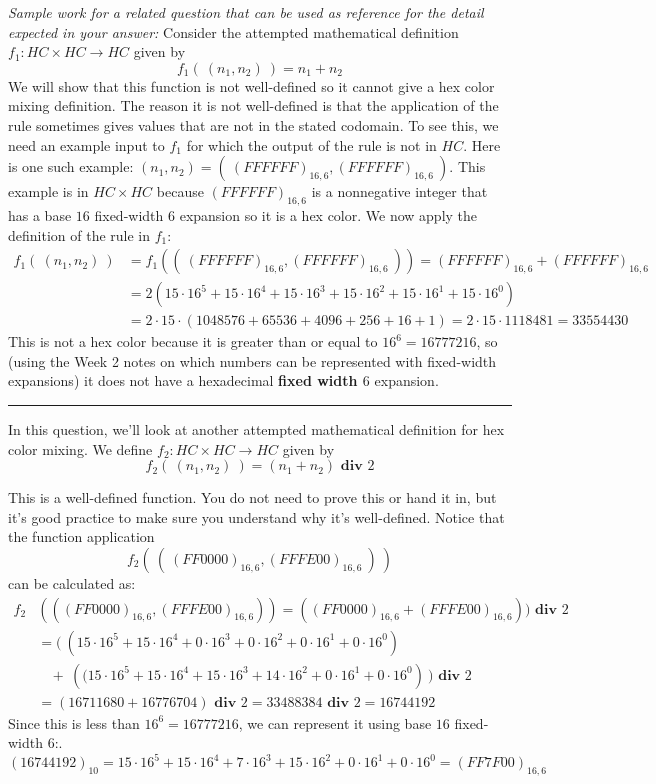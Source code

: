 \documentclass[12pt, oneside]{article}
\begin{document}
\begin{enumerate}[labelindent=0pt, leftmargin=0pt]
\begin{enumerate}
{\it Sample work for a related question that can be used as reference for the detail expected 
in your answer:} Consider the attempted mathematical definition  $f_1: HC\times HC \to HC$ given by
\[
f_1 (~(n_1, n_2) ~) = n_1 + n_2
\]
We will show that this function is not well-defined so it cannot give a hex color mixing definition. 
The reason it is not well-defined
is that the application of the rule sometimes gives values that are not in the stated codomain. 
To see this, we need an example input to $f_1$ for which the output of the rule is not in $HC$.
Here is one such example: $(n_1, n_2) = (~(FFFFFF)_{16,6}, (FFFFFF)_{16,6}~)$. 
This example is in $HC \times HC$
because $(FFFFFF)_{16,6}$ is a nonnegative integer that has a base $16$ fixed-width $6$ expansion 
so it is a hex color.
We now apply the definition of the rule in $f_1$:
\begin{align*}
f_1 (~(n_1, n_2) ~) &=  f_1 ( (~(FFFFFF)_{16,6}, (FFFFFF)_{16,6}~) ) = (FFFFFF)_{16,6} + (FFFFFF)_{16,6} \\
&= 2 \left( 15\cdot 16^5 + 15\cdot 16^4 + 15 \cdot 16^3 + 15 \cdot 16^2 + 15 \cdot 16^1 + 15 \cdot 16^0 \right) \\
&= 2 \cdot 15 \cdot (1048576 + 65536 + 4096 + 256 + 16 + 1) = 2 \cdot 15 \cdot 1118481 = 33554430
\end{align*}
This is not a hex color because it is greater than or equal to $16^6 = 16777216$, 
so (using the Week 2 notes on which numbers can be represented
with fixed-width expansions) it does not have a hexadecimal {\bf fixed width $6$} expansion.

\rule{0.5\textwidth}{.4pt}

In this question, we'll look at another attempted mathematical definition for hex color mixing. 
We define $f_2: HC\times HC \to HC$ given by
\[
f_2 (~(n_1, n_2) ~) = (n_1 + n_2) \textbf{ div } 2
\]

This is a well-defined function. You do not need to prove this or hand it in, but it's good practice to make 
sure you understand why it's well-defined. Notice that the function application 
\[
f_2 ( ~(~ (FF0000)_{16,6} , (FFFE00)_{16,6} ~)~)
\]
can be calculated as:
\begin{align*}
f_2&(((FF0000)_{16,6}, (FFFE00)_{16,6}))=
 ((FF0000)_{16,6} + (FFFE00)_{16,6})) \textbf{ div } 2\\
&= \big(~ \left(15\cdot16^5 + 15\cdot16^4 + 0\cdot16^3 + 0\cdot16^2 + 0\cdot16^1 + 0\cdot16^0 \right) \\
&~~~~+~
    \left((15\cdot16^5 + 15\cdot16^4 + 15\cdot16^3 + 14\cdot16^2 + 0\cdot16^1 + 0\cdot16^0\right )~\big )\textbf{ div } 2\\
&= (16711680 + 16776704) \textbf{ div } 2 = 33488384 \textbf{ div } 2 = 16744192
\end{align*}
Since this is less than $16^6 = 16777216$, we can represent it using base $16$ fixed-width $6$:.
$$(16744192)_{10} = 15\cdot16^5 + 15\cdot16^4 + 7\cdot16^3 + 15\cdot16^2 + 0\cdot16^1 + 0\cdot16^0 = (FF7F00)_{16,6}$$


\end{enumerate}
\end{enumerate}
\end{document}
